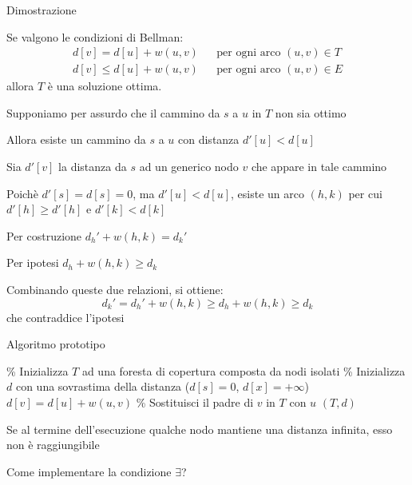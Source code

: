 \begin{frame}{Dimostrazione}

\vspace{-9pt}
\begin{myboxtitle}
Se valgono le condizioni di Bellman:
\begin{align*} 
d[v] = d[u] + w(u,v) && \textrm{per ogni arco $(u,v) \in T$}\\
d[v] \leq d[u] + w(u,v) && \textrm{per ogni arco $(u,v) \in E$}
\end{align*}
allora $T$ è una soluzione ottima.
\end{myboxtitle}

\begin{overprint}
\BI
\item Supponiamo per assurdo che il cammino da $s$ a $u$ in $T$ non sia ottimo
\item Allora esiste un cammino da $s$ a $u$ con distanza $d'[u]<d[u]$
\item Sia $d'[v]$ la distanza da $s$ ad un generico nodo $v$ che appare in
tale cammino
\item Poichè $d'[s] = d[s] = 0$, ma $d'[u]<d[u]$, esiste un arco $(h,k)$ 
per cui $d'[h] \geq d'[h]$ e $d'[k]< d[k]$
\EI
{}
\BI
\item Per costruzione $d_h' + w(h,k) = d_k'$
\item Per ipotesi $d_h + w(h,k) \ge d_k$
\item Combinando queste due relazioni, si ottiene: 
\[
  d_k' = d_h' + w(h,k) \ge d_h + w(h,k) \ge d_k
\]
che contraddice l'ipotesi
\EI
\end{overprint}

\end{frame}

\begin{frame}{Algoritmo prototipo}

\vspace{-9pt}
\begin{Procedure}
\caption[A]{$(\INTARRAY, \INTARRAY)$ \shortestprototype($\Graph\ G,\ \Node\ s$)}

\% Inizializza $T$ ad una foresta di copertura composta da nodi isolati\;
\% Inizializza $d$ con una sovrastima della distanza ($d[s]=0$, $d[x] = +\infty$)\;
{
  $d[v] = d[u] + w(u,v)$\;
  \% Sostituisci il padre di $v$ in $T$ con $u$\;
}
\Return $(T,d)$
\end{Procedure}

\begin{myboxtitle}[Note]
\BI
\item Se al termine dell'esecuzione qualche nodo mantiene una distanza infinita, esso non è raggiungibile
\item Come implementare la condizione $\exists$?
\EI
\end{myboxtitle}
\end{frame}

